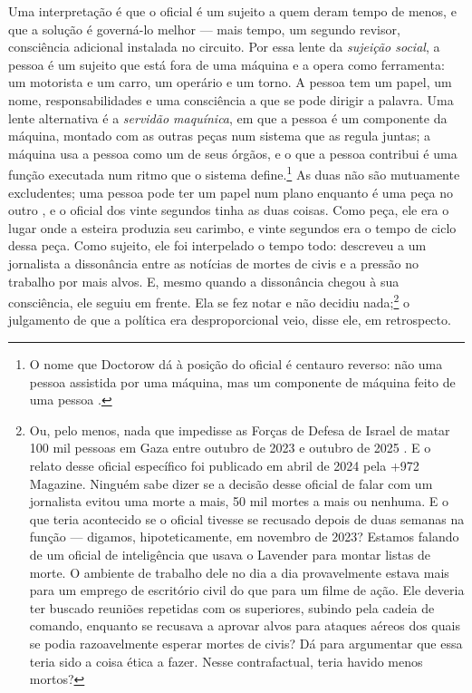 Uma interpretação é que o oficial é um sujeito a quem deram tempo de menos, e que a solução é governá-lo melhor — mais tempo, um segundo revisor, consciência adicional instalada no circuito. Por essa lente da \emph{sujeição social}, a pessoa é um sujeito que está fora de uma máquina e a opera como ferramenta: um motorista e um carro, um operário e um torno. A pessoa tem um papel, um nome, responsabilidades e uma consciência a que se pode dirigir a palavra. Uma lente alternativa é a \emph{servidão maquínica}, em que a pessoa é um componente da máquina, montado com as outras peças num sistema que as regula juntas; a máquina usa a pessoa como um de seus órgãos, e o que a pessoa contribui é uma função executada num ritmo que o sistema define.\footnote{O nome que Doctorow dá à posição do oficial é centauro reverso: não uma pessoa assistida por uma máquina, mas um componente de máquina feito de uma pessoa \autocite{doctorow2026reversecentaur}.} As duas não são mutuamente excludentes; uma pessoa pode ter um papel num plano enquanto é uma peça no outro \autocite[Platô 13, “The Apparatus of Capture”: há servidão quando os próprios seres humanos são peças constituintes de uma máquina que compõem entre si e com outras coisas, sob o controle e a direção de uma unidade superior, e sujeição quando a unidade superior constitui o ser humano como sujeito ligado a um novo objeto exterior, que pode ser um animal, uma ferramenta ou mesmo uma máquina]{deleuze1987plateaus}, e o oficial dos vinte segundos tinha as duas coisas. Como peça, ele era o lugar onde a esteira produzia seu carimbo, e vinte segundos era o tempo de ciclo dessa peça. Como sujeito, ele foi interpelado o tempo todo: descreveu a um jornalista a dissonância entre as notícias de mortes de civis e a pressão no trabalho por mais alvos. E, mesmo quando a dissonância chegou à sua consciência, ele seguiu em frente. Ela se fez notar e não decidiu nada;\footnote{Ou, pelo menos, nada que impedisse as Forças de Defesa de Israel de matar 100 mil pessoas em Gaza entre outubro de 2023 e outubro de 2025 \autocite{gomezugarte2025uncertainty,acosta2026gaza,economist2025gaza}. E o relato desse oficial específico foi publicado em abril de 2024 pela +972 Magazine. Ninguém sabe dizer se a decisão desse oficial de falar com um jornalista evitou uma morte a mais, 50 mil mortes a mais ou nenhuma. E o que teria acontecido se o oficial tivesse se recusado depois de duas semanas na função — digamos, hipoteticamente, em novembro de 2023? Estamos falando de um oficial de inteligência que usava o Lavender para montar listas de morte. O ambiente de trabalho dele no dia a dia provavelmente estava mais para um emprego de escritório civil do que para um filme de ação. Ele deveria ter buscado reuniões repetidas com os superiores, subindo pela cadeia de comando, enquanto se recusava a aprovar alvos para ataques aéreos dos quais se podia razoavelmente esperar mortes de civis? Dá para argumentar que essa teria sido a coisa ética a fazer. Nesse contrafactual, teria havido menos mortos?} o julgamento de que a política era desproporcional veio, disse ele, em retrospecto.

